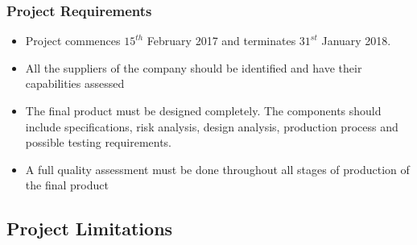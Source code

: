 \subsubsection{Project Requirements}

\begin{itemize}
\item Project commences $15^{th}$ February 2017 and terminates $31^{st}$ January 2018.
\item All the suppliers of the company should be identified and have their capabilities assessed 
\item The final product must be designed completely. The components should include specifications, risk analysis, design analysis, production process and possible testing requirements.
\item A full quality assessment must be done throughout all stages of production of the final product
\end{itemize}

\newpage
\subsection{Project Limitations}


